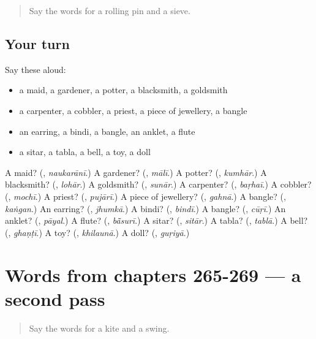 \begin{quote}
Say the words for a rolling pin and a sieve.
\end{quote}

\subsection*{Your turn}
Say these aloud:

\begin{itemize}
\raggedright
  \item a maid, a gardener, a potter, a blacksmith, a goldsmith
  \item a carpenter, a cobbler, a priest, a piece of jewellery, a bangle
  \item an earring, a bindi, a bangle, an anklet, a flute
  \item a sitar, a tabla, a bell, a toy, a doll
\end{itemize}

\begin{tcolorbox}[breakable,colback=teal!4,colframe=teal!35!black,title={Before you move on}]
A maid? (\textbf{}, \emph{naukarānī}.) A gardener? (\textbf{}, \emph{mālī}.) A potter? (\textbf{}, \emph{kumhār}.) A blacksmith? (\textbf{}, \emph{lohār}.) A goldsmith? (\textbf{}, \emph{sunār}.) A carpenter? (\textbf{}, \emph{baṛhaī}.) A cobbler? (\textbf{}, \emph{mochī}.) A priest? (\textbf{}, \emph{pujārī}.) A piece of jewellery? (\textbf{}, \emph{gahnā}.) A bangle? (\textbf{}, \emph{kaṅgan}.) An earring? (\textbf{}, \emph{jhumkā}.) A bindi? (\textbf{}, \emph{bindī}.) A bangle? (\textbf{}, \emph{cūṛī}.) An anklet? (\textbf{}, \emph{pāyal}.) A flute? (\textbf{}, \emph{bā̃surī}.) A sitar? (\textbf{}, \emph{sitār}.) A tabla? (\textbf{}, \emph{tablā}.) A bell? (\textbf{}, \emph{ghaṇṭī}.) A toy? (\textbf{}, \emph{khilaunā}.) A doll? (\textbf{}, \emph{guṛiyā}.)
\end{tcolorbox}
\section[(dialogue)]{Words from chapters 265-269 — a second pass}

\label{lesson:HI-R269-second-pass-words-from-chapters-265-269}



\begin{quote}
Say the words for a kite and a swing.
\end{quote}


